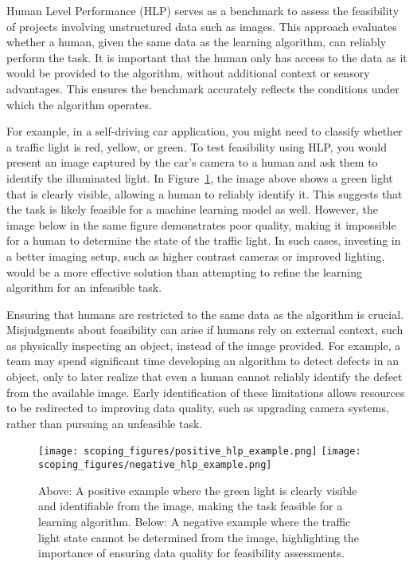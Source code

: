 \documentclass[12pt,openany]{book}
\begin{document}
Human Level Performance (HLP) serves as a benchmark to assess the feasibility of projects involving unstructured data such as images. This approach evaluates whether a human, given the same data as the learning algorithm, can reliably perform the task. It is important that the human only has access to the data as it would be provided to the algorithm, without additional context or sensory advantages. This ensures the benchmark accurately reflects the conditions under which the algorithm operates. \newline

For example, in a self-driving car application, you might need to classify whether a traffic light is red, yellow, or green. To test feasibility using HLP, you would present an image captured by the car's camera to a human and ask them to identify the illuminated light. In Figure~\ref{fig:hlp_examples}, the image above shows a green light that is clearly visible, allowing a human to reliably identify it. This suggests that the task is likely feasible for a machine learning model as well. However, the image below in the same figure demonstrates poor quality, making it impossible for a human to determine the state of the traffic light. In such cases, investing in a better imaging setup, such as higher contrast cameras or improved lighting, would be a more effective solution than attempting to refine the learning algorithm for an infeasible task. \newline


Ensuring that humans are restricted to the same data as the algorithm is crucial. Misjudgments about feasibility can arise if humans rely on external context, such as physically inspecting an object, instead of the image provided. For example, a team may spend significant time developing an algorithm to detect defects in an object, only to later realize that even a human cannot reliably identify the defect from the available image. Early identification of these limitations allows resources to be redirected to improving data quality, such as upgrading camera systems, rather than pursuing an unfeasible task. \newline

\begin{figure}[H]
    \centering
    \texttt{[image: scoping\_figures/positive\_hlp\_example.png]}
    \vspace{0.5cm} %
    \texttt{[image: scoping\_figures/negative\_hlp\_example.png]}
    \caption{Above: A positive example where the green light is clearly visible and identifiable from the image, making the task feasible for a learning algorithm. Below: A negative example where the traffic light state cannot be determined from the image, highlighting the importance of ensuring data quality for feasibility assessments.}
    \label{fig:hlp_examples}
\end{figure}
\end{document}
